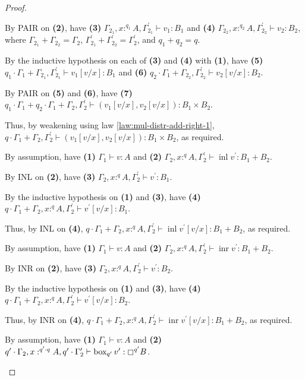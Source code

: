\documentclass[acmsmall,screen,nonacm]{acmart}
\DeclareMathOperator{\bbox}{\text{box}}
\DeclareMathOperator{\inl}{\text{inl}}
\DeclareMathOperator{\inr}{\text{inr}}
\newcommand{\tee}{\vdash}
\begin{document}
\begin{proof}
\begin{description}
    By PAIR on \textbf{(2)}, have \textbf{(3)} $\Gamma_{2_1}, x :^{q_1} A, \Gamma_{2_1}^\prime \tee v_1 : B_1$ and \textbf{(4)} $\Gamma_{2_2}, x : ^{q_2} A, \Gamma_{2_2}^\prime \tee v_2 : B_2$, where $\Gamma_{2_1} + \Gamma_{2_2} = \Gamma_2$, $\Gamma_{2_1}^\prime + \Gamma_{2_2}^\prime = \Gamma_2^\prime$, and $q_1 + q_2 = q$.

    By the inductive hypothesis on each of \textbf{(3)} and \textbf{(4)} with \textbf{(1)}, have \textbf{(5)} $q_1 \cdot \Gamma_1 + \Gamma_{2_1}, \Gamma_{2_1}^\prime \tee v_1[v/x] : B_1$ and \textbf{(6)} $q_2 \cdot \Gamma_1 + \Gamma_{2_2}, \Gamma_{2_2}^\prime \tee v_2[v/x] : B_2$.

    By PAIR on \textbf{(5)} and \textbf{(6)}, have \textbf{(7)} $q_1 \cdot \Gamma_1 + q_2 \cdot \Gamma_1 + \Gamma_2, \Gamma_2^\prime \tee (v_1[v/x], v_2[v/x]) : B_1 \times B_2$.

    Thus, by weakening using law \ref{law:mul-distr-add-right-1}, $q \cdot \Gamma_1 + \Gamma_2, \Gamma_2^\prime \tee (v_1[v/x], v_2[v/x]) : B_1 \times B_2$, as required.
    \\
    \item[Case INL.] 
    By assumption, have \textbf{(1)} $\Gamma_1 \tee v : A$ and \textbf{(2)} $\Gamma_2, x :^q A, \Gamma_2^\prime \tee \inl v^\prime : B_1 + B_2$.
    
    By INL on \textbf{(2)}, have \textbf{(3)} $\Gamma_2, x :^q A, \Gamma_2^\prime \tee v^\prime : B_1$.
    
    By the inductive hypothesis on \textbf{(1)} and \textbf{(3)}, have \textbf{(4)} $q \cdot \Gamma_1 + \Gamma_2, x :^q A, \Gamma_2^\prime \tee v^\prime[v/x] : B_1$.

    Thus, by INL on \textbf{(4)}, $q \cdot \Gamma_1 + \Gamma_2, x :^q A, \Gamma_2^\prime \tee \inl v^\prime[v/x] : B_1 + B_2$, as required.
    \\
    \item[Case INR.] 
    By assumption, have \textbf{(1)} $\Gamma_1 \tee v : A$ and \textbf{(2)} $\Gamma_2, x :^q A, \Gamma_2^\prime \tee \inr v^\prime : B_1 + B_2$.
    
    By INR on \textbf{(2)}, have \textbf{(3)} $\Gamma_2, x :^q A, \Gamma_2^\prime \tee v^\prime : B_2$.
    
    By the inductive hypothesis on \textbf{(1)} and \textbf{(3)}, have \textbf{(4)} $q \cdot \Gamma_1 + \Gamma_2, x :^q A, \Gamma_2^\prime \tee v^\prime[v/x] : B_2$.

    Thus, by INR on \textbf{(4)}, $q \cdot \Gamma_1 + \Gamma_2, x :^q A, \Gamma_2^\prime \tee \inr v^\prime[v/x] : B_1 + B_2$, as required.
    \\
    \item[Case $\boxempty$I.] 
    By assumption, have \textbf{(1)} $\Gamma_1 \tee v : A$ and \textbf{(2)} $q^\prime \cdot \Gamma_2, x :^{q^\prime \cdot q} A, q^\prime \cdot \Gamma_2^\prime \tee \bbox_{q^\prime} v^\prime : \boxempty^{q^\prime} B$.


\end{description}
\end{proof}
\end{document}
